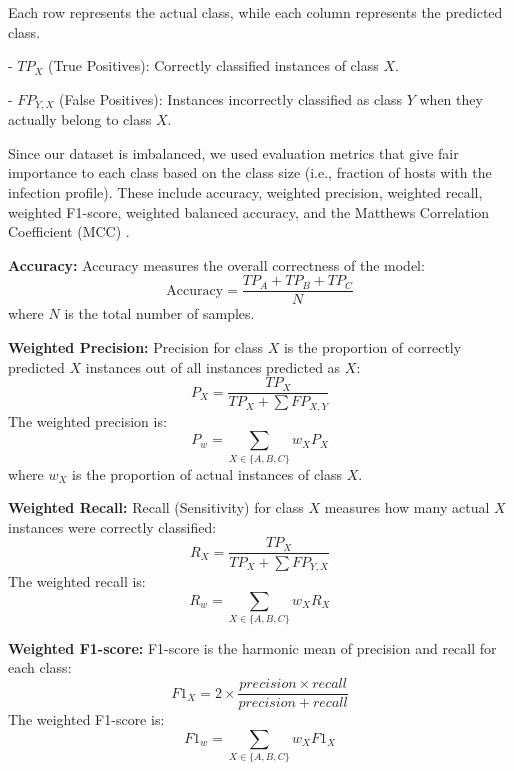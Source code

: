\documentclass[oneside, a4paper, onecolumn, 11pt]{article}
\begin{document}
Each row represents the actual class, while each column represents the predicted class.

- $TP_X$ (True Positives): Correctly classified instances of class $X$.

- $FP_{Y,X}$ (False Positives): Instances incorrectly classified as class $Y$ when they actually belong to class $X$.

Since our dataset is imbalanced, we used evaluation metrics that give fair importance to each class based on the class size (i.e., fraction of hosts with the infection profile). These include accuracy, weighted precision, weighted recall, weighted F1-score, weighted balanced accuracy, and the Matthews Correlation Coefficient (MCC) \citep{Poisot2023-jo}.

\textbf{Accuracy:}
Accuracy measures the overall correctness of the model:
\begin{equation}
    \text{Accuracy} = \frac{TP_A + TP_B + TP_C}{N}
\end{equation}
where $N$ is the total number of samples.

\textbf{Weighted Precision:}
Precision for class $X$ is the proportion of correctly predicted $X$ instances out of all instances predicted as $X$:
\begin{equation}
    P_X = \frac{TP_X}{TP_X + \sum FP_{X,Y}}
\end{equation}
The weighted precision is:
\begin{equation}
    P_w = \sum_{X \in \{A,B,C\}} w_X P_X
\end{equation}
where $w_X$ is the proportion of actual instances of class $X$.

\textbf{Weighted Recall:}
Recall (Sensitivity) for class $X$ measures how many actual $X$ instances were correctly classified:
\begin{equation}
    R_X = \frac{TP_X}{TP_X + \sum FP_{Y,X}}
\end{equation}
The weighted recall is:
\begin{equation}
    R_w = \sum_{X \in \{A,B,C\}} w_X R_X
\end{equation}

\textbf{Weighted F1-score:}
F1-score is the harmonic mean of precision and recall for each class:
\begin{equation}
    F1_X = 2 \times \frac{precision \times recall}{precision + recall}
\end{equation}
The weighted F1-score is:
\begin{equation}
    F1_w = \sum_{X \in \{A,B,C\}} w_X F1_X
\end{equation}
\end{document}

